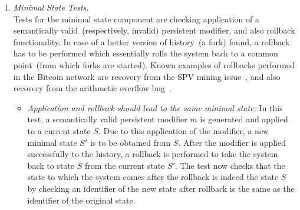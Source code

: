 \begin{enumerate}[\IEEEsetlabelwidth{Z}]
\item \textit{Minimal State Tests.}\\
Tests for the minimal state component are checking application of a semantically valid~(respectively, invalid) persistent modifier, and also rollback functionality. In case of a better version of history~(a fork) found, a rollback has to be performed which essentially rolls the system back to a common point~(from which forks are started). Known examples of rollbacks performed in the Bitcoin network are recovery from the SPV mining issue~\cite{spvMining}, and also recovery from the arithmetic overflow bug~\cite{overflow}.

\begin{itemize}[]

\item \textit{Application and rollback should lead to the same minimal state:} In this test, a semantically valid persistent modifier $m$ is generated and applied to a current state $S$. Due to this application of the modifier, a new minimal state $S'$ is to be obtained from $S$. After the modifier is applied successfully to the history, a rollback is performed to take the system back to state $S$ from the current state $S'$. The test now checks that the state to which the system comes after the rollback is indeed the state $S$ by checking an identifier of the new state after rollback is the same as the identifier of the original state.\\


\end{itemize}
\end{enumerate}
